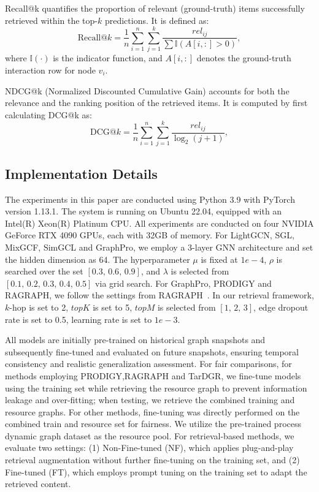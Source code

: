 \documentclass[letterpaper]{article} %
\begin{document}
{Recall@k} quantifies the proportion of relevant (ground-truth) items successfully retrieved within the top-$k$ predictions. It is defined as:
\begin{equation}
\text{Recall@}k = \frac{1}{n} \sum_{i=1}^n 
\sum_{j=1}^k \frac{rel_{ij}}{\sum \mathbb{I}(A[i,:] > 0)},
\label{eq:recall}
\end{equation}
where $\mathbb{I}(\cdot)$ is the indicator function, and $A[i,:]$ denotes the ground-truth interaction row for node $v_i$.

{NDCG@k} (Normalized Discounted Cumulative Gain) accounts for both the relevance and the ranking position of the retrieved items. It is computed by first calculating DCG@k as:
\begin{equation}
\text{DCG@}k = \frac{1}{n} \sum_{i=1}^n 
\sum_{j=1}^k \frac{rel_{ij}}{\log_2 (j + 1)},
\label{eq:dcg}
\end{equation}



\subsection{Implementation Details}
\label{appendix:setting-parameter}
The experiments in this paper are conducted using Python 3.9 with PyTorch version 1.13.1. The system is running on Ubuntu 22.04, equipped with an Intel(R) Xeon(R) Platinum CPU.
All experiments are conducted on four NVIDIA GeForce RTX 4090 GPUs, each with 32GB of memory. For LightGCN, SGL, MixGCF, SimGCL and GraphPro, we employ a 3-layer GNN architecture and set the hidden dimension as 64. The hyperparameter $\mu$ is fixed at $1e-4$, $\rho$ is searched over the set $[0.3,\, 0.6,\, 0.9]$, and $\lambda$ is selected from $[0.1,\, 0.2,\, 0.3,\, 0.4,\, 0.5]$ via grid search. For GraphPro, PRODIGY and RAGRAPH, we follow the settings from RAGRAPH~\cite{jiang2024ragraph}. 
In our retrieval framework, $k$-hop is set to 2, $topK$ is set to 5, $topM$ is selected from $[1,\, 2,\, 3]$, edge dropout rate is set to 0.5, learning rate is set to $1e-3$.

All models are initially pre-trained on historical graph snapshots and subsequently fine-tuned and evaluated on future snapshots, ensuring temporal consistency and realistic generalization assessment. For fair comparisons, for methods employing PRODIGY,RAGRAPH and TarDGR, we fine-tune models using the training set while retrieving the resource graph to prevent information leakage and over-fitting; when testing, we retrieve the combined training and resource graphs. For other methods, fine-tuning was directly performed on the combined train and resource set for fairness. We utilize the pre-trained process dynamic graph dataset as the resource pool. For retrieval-based methods, we evaluate two settings: (1) {Non-Fine-tuned (NF)}, which applies plug-and-play retrieval augmentation without further fine-tuning on the training set, and (2) {Fine-tuned (FT)}, which employs prompt tuning on the training set to adapt the retrieved content. 
\end{document}
